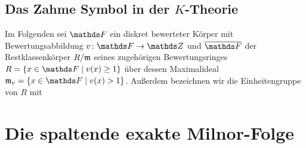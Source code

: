 \documentclass[ngerman,fontsize=11pt, paper=a4, parskip=half, titlepage=true, toc=bib]{scrartcl}
\begin{document}
\subsection{Das Zahme Symbol in der $K$-Theorie}
Im Folgenden sei $\F$ ein diskret bewerteter Körper mit
Bewertungsabbildung $ v\colon \F\to\Z$ und
$\overline{\F}$ der Restklassenkörper $R/\mathfrak{m}$ seines
zugehörigen Bewertungsringes $R=\left\{x\in\F\mid v(x)\geq1\right\}$
über dessen Maximalideal $\frakm_v=\left\{x\in\F\mid v(x)>1\right\}$.
Außerdem bezeichnen wir die Einheitengruppe von $R$ mit 

\begin{Satz}\end{Satz}


\section{Die spaltende exakte Milnor-Folge}
\cite[][Theorem 2.3]{milnor}



\printindex

\nocite{*}
\printbibliography
\end{document}

